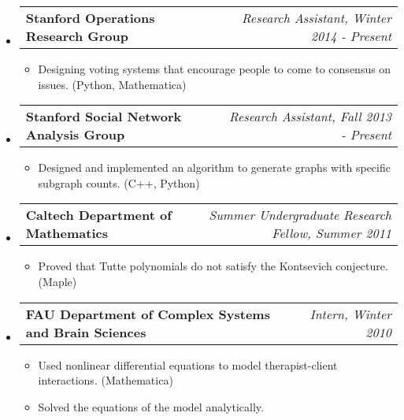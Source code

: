 \documentclass[letterpaper,10pt]{article}
\makeatletter
\newcommand{\resitem}[1]{\item #1 \vspace{-2pt}}
\newcommand{\ressubheading}[4]{
\begin{tabular*}{7.0in}{l@{\extracolsep{\fill}}r}
		\textbf{#1} & \textit{#4} \\
\end{tabular*}\vspace{-6pt}}
\makeatother
\begin{document}
\begin{itemize}
\item
	\ressubheading{Stanford Operations Research Group}{Stanford, CA}{Research Assistant}{Research Assistant, Winter 2014 - Present}
	\begin{itemize}
		\resitem{Designing voting systems that encourage people to come to consensus on issues.  (Python, Mathematica)}
	\end{itemize}
\item
	\ressubheading{Stanford Social Network Analysis Group}{Stanford, CA}{Research Assistant}{Research Assistant, Fall 2013 - Present}
	\begin{itemize}
		\resitem{Designed and implemented an algorithm to generate graphs with specific subgraph counts.  (C++, Python)}
	\end{itemize}


\item
	\ressubheading{Caltech Department of Mathematics}{Pasadena, CA}{Summer Undergraduate Research Fellow}{Summer Undergraduate Research Fellow, Summer 2011}
	\begin{itemize}
		\resitem{Proved that Tutte polynomials do not satisfy the Kontsevich conjecture.  (Maple)}
	\end{itemize}

\item
	\ressubheading{FAU Department of Complex Systems and Brain Sciences}{Boca Raton, FL}{Research Intern}{Intern, Winter 2010}
	\begin{itemize}
		\resitem{Used nonlinear differential equations to model therapist-client interactions.  (Mathematica)}
		\resitem{Solved the equations of the model analytically.}
	\end{itemize}


\end{itemize}
\end{document}

